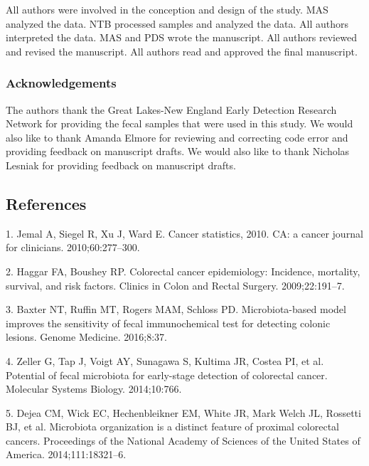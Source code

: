 \documentclass[12pt,]{article}
\begin{document}
All authors were involved in the conception and design of the study. MAS
analyzed the data. NTB processed samples and analyzed the data. All
authors interpreted the data. MAS and PDS wrote the manuscript. All
authors reviewed and revised the manuscript. All authors read and
approved the final manuscript.

\subsubsection{Acknowledgements}\label{acknowledgements}

The authors thank the Great Lakes-New England Early Detection Research
Network for providing the fecal samples that were used in this study. We
would also like to thank Amanda Elmore for reviewing and correcting code
error and providing feedback on manuscript drafts. We would also like to
thank Nicholas Lesniak for providing feedback on manuscript drafts.

\newpage

\subsection*{References}\label{references}

\hypertarget{refs}{}
\hypertarget{ref-jemal_cancer_2010}{}
1. Jemal A, Siegel R, Xu J, Ward E. Cancer statistics, 2010. CA: a
cancer journal for clinicians. 2010;60:277--300.

\hypertarget{ref-haggar_colorectal_2009}{}
2. Haggar FA, Boushey RP. Colorectal cancer epidemiology: Incidence,
mortality, survival, and risk factors. Clinics in Colon and Rectal
Surgery. 2009;22:191--7.

\hypertarget{ref-baxter_microbiota-based_2016}{}
3. Baxter NT, Ruffin MT, Rogers MAM, Schloss PD. Microbiota-based model
improves the sensitivity of fecal immunochemical test for detecting
colonic lesions. Genome Medicine. 2016;8:37.

\hypertarget{ref-zeller_potential_2014}{}
4. Zeller G, Tap J, Voigt AY, Sunagawa S, Kultima JR, Costea PI, et al.
Potential of fecal microbiota for early-stage detection of colorectal
cancer. Molecular Systems Biology. 2014;10:766.

\hypertarget{ref-dejea_microbiota_2014}{}
5. Dejea CM, Wick EC, Hechenbleikner EM, White JR, Mark Welch JL,
Rossetti BJ, et al. Microbiota organization is a distinct feature of
proximal colorectal cancers. Proceedings of the National Academy of
Sciences of the United States of America. 2014;111:18321--6.
\end{document}
